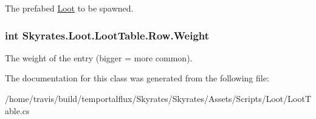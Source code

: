 The prefabed \hyperlink{class_skyrates_1_1_loot_1_1_loot}{Loot} to be spawned. 

\hypertarget{class_skyrates_1_1_loot_1_1_loot_table_1_1_row_add613954731de35f73e733bd7297108e}{
\subsubsection[{Weight}]{\setlength{\rightskip}{0pt plus 5cm}int Skyrates.\-Loot.\-Loot\-Table.\-Row.\-Weight}}\label{class_skyrates_1_1_loot_1_1_loot_table_1_1_row_add613954731de35f73e733bd7297108e}


The weight of the entry (bigger = more common). 



The documentation for this class was generated from the following file\-:\begin{DoxyCompactItemize}
\item 
/home/travis/build/temportalflux/\-Skyrates/\-Skyrates/\-Assets/\-Scripts/\-Loot/Loot\-Table.\-cs\end{DoxyCompactItemize}
